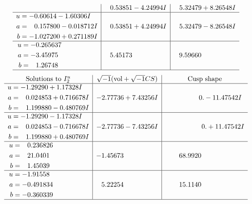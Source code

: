 \documentclass[1p]{elsarticle_modified}
\theoremstyle{definition}
\newcommand{\I}{\sqrt{-1}}
\begin{document}
$$\begin{array}{c|c|c}
 & \phantom{-}0.53851 - 4.24994 I & \phantom{-}5.32479 + 8.26548 I \\ \hline\begin{aligned}
u &= -0.60614 - 1.60306 I \\
a &= \phantom{-}0.157800 - 0.018712 I \\
b &= -1.027200 + 0.271189 I\end{aligned}
 & \phantom{-}0.53851 + 4.24994 I & \phantom{-}5.32479 - 8.26548 I \\ \hline\begin{aligned}
u &= -0.265637\phantom{ +0.000000I} \\
a &= -3.45975\phantom{ +0.000000I} \\
b &= \phantom{-}1.26748\phantom{ +0.000000I}\end{aligned}
 & \phantom{-}5.45173\phantom{ +0.000000I} & \phantom{-}9.59660\phantom{ +0.000000I}\\
 \hline 
 \end{array}$$\newpage$$\begin{array}{c|c|c}  
\text{Solutions to }I^u_{2}& \I (\text{vol} + \sqrt{-1}CS) & \text{Cusp shape}\\
 \hline 
\begin{aligned}
u &= -1.29290 + 1.17328 I \\
a &= \phantom{-}0.024853 + 0.716678 I \\
b &= \phantom{-}1.199880 - 0.480769 I\end{aligned}
 & -2.77736 + 7.43256 I & \phantom{-0.000000 } 0. - 11.47542 I \\ \hline\begin{aligned}
u &= -1.29290 - 1.17328 I \\
a &= \phantom{-}0.024853 - 0.716678 I \\
b &= \phantom{-}1.199880 + 0.480769 I\end{aligned}
 & -2.77736 - 7.43256 I & \phantom{-0.000000 -}0. + 11.47542 I \\ \hline\begin{aligned}
u &= \phantom{-}0.236826\phantom{ +0.000000I} \\
a &= \phantom{-}21.0401\phantom{ +0.000000I} \\
b &= \phantom{-}1.45039\phantom{ +0.000000I}\end{aligned}
 & -1.45673\phantom{ +0.000000I} & \phantom{-}68.9920\phantom{ +0.000000I} \\ \hline\begin{aligned}
u &= -1.91558\phantom{ +0.000000I} \\
a &= -0.491834\phantom{ +0.000000I} \\
b &= -0.360339\phantom{ +0.000000I}\end{aligned}
 & \phantom{-}5.22254\phantom{ +0.000000I} & \phantom{-}15.1140\phantom{ +0.000000I}\\
 \hline 
 \end{array}$$\newpage
\end{document}
